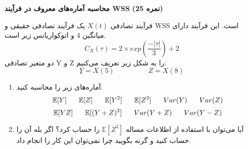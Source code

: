 \Large \textbf{محاسبه آماره‌های معروف در فرآیند WSS}
\large \textbf{(25 نمره)}

\normalsize \vspace{0.5cm}
فرآیند تصادفی
$ X(t) $
یک فرآیند تصادفی حقیقی و WSS است. این فرآیند دارای میانگین 4 و اتوکواریانس زیر است.
$$
C_X(\tau) = 2 \times exp(\frac{-|\tau|}{3}) + 2
$$
دو متغیر تصادفی Y و Z را به شکل زیر تعریف می‌کنیم:
$$
ِY = X(5)  \hspace{2cm} Z = X(8)
$$
\begin{enumerate}[label=(\alph*)]
	\item
	آماره‌های زیر را محاسبه کنید.
	$$
	\mathbb{E}[Y] 
	\hspace{0.6cm} 
	\mathbb{E}[Z] 
	\hspace{0.6cm}
	\mathbb{E}[Y^2] 
	\hspace{0.6cm} 
	\mathbb{E}[Z^2] 
	\hspace{0.6cm}
	Var(Y)
	\hspace{0.6cm} 
	Var(Z)
	$$
	$$
	\mathbb{E}[YZ] 
	\hspace{0.6cm} 
	\mathbb{E}[(Y+Z)^2] 
	\hspace{0.6cm}
	Var(Y + Z)
	\hspace{0.6cm}
	Var(Y - Z)
	$$
	\item 
	آیا می‌توان با استفاده از اطلاعات مساله
	$ \mathbb{E}[Z^3] $
	را حساب کرد؟ اگر بله آن را حساب کنید و گرنه بگویید چرا نمی‌توان این کار را انجام داد.
\end{enumerate}


